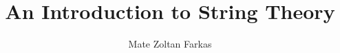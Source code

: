 \documentclass[11pt]{beamer}
\begin{document}
	\author{Mate Zoltan Farkas}
	\title{An Introduction to String Theory}
	\begin{frame}[plain]
		\maketitle
	\end{frame}
	
	\begin{frame}
		\frametitle{}
	\end{frame}
\end{document}
